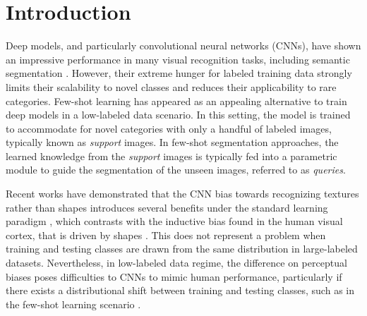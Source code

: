 \documentclass[runningheads]{llncs}
\begin{document}
\section{Introduction}

Deep models, and particularly convolutional neural networks (CNNs), have shown an impressive performance in many visual recognition tasks, including semantic segmentation \cite{long2015fully}. However, their extreme hunger for labeled training data strongly limits their scalability to novel classes and reduces their applicability to rare categories. Few-shot learning \cite{ravi2016optimization,finn2017model} has appeared as an appealing alternative to train deep models in a low-labeled data scenario. In this setting, the model is trained to accommodate for novel categories with only a handful of labeled images, typically known as \textit{support} images. In few-shot segmentation approaches, the learned knowledge from the \textit{support} images is typically fed into a parametric module to guide the segmentation of the unseen images, referred to as \textit{queries}.


Recent works have demonstrated that the CNN bias towards recognizing textures rather than shapes introduces several benefits under the standard learning paradigm \cite{geirhos2018imagenet,brendel2019approximating}, which contrasts with the inductive bias found in the human visual cortex, that is driven by shapes \cite{landau1988importance}. This does not represent a problem when training and testing classes are drawn from the same distribution in large-labeled datasets. Nevertheless, in low-labeled data regime, the difference on perceptual biases poses difficulties to CNNs to mimic human performance, particularly if there exists a distributional shift between training and testing classes, such as in the few-shot learning scenario \cite{ringer2019texture}. 
\end{document}
